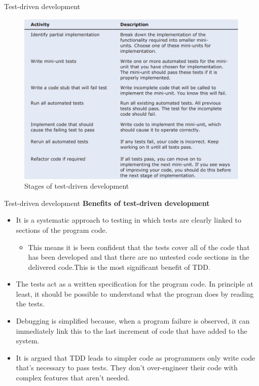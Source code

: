 \documentclass{beamer}
\begin{document}
\begin{frame}{Test-driven development}
	\begin{figure}
		\includegraphics[scale=.45]{img/m3_32}
		\caption{Stages of test-driven development}
	\end{figure}
\end{frame}
\begin{frame}{Test-driven development}
	\textbf{Benefits of test-driven development}
	\begin{itemize}
		\item It is a systematic approach to testing in which tests are clearly linked to sections of the program code. 
		\begin{itemize}
			\item This means it is been confident that the tests cover all of the code that has been developed and that there are no untested code sections in the delivered code.This is the most significant benefit of TDD. 
		\end{itemize}
	\item The tests act as a written specification for the program code. In principle at least, it should be possible to understand what the program does by reading the tests. 
	\item Debugging is simplified because, when a program failure is observed, it can immediately link this to the last increment of code that have  added to the system.
	\item It is argued that TDD leads to simpler code as programmers only write code that’s necessary to pass tests. They don’t over-engineer their code with complex features that aren’t needed.
	
	\end{itemize}
\end{frame}
\end{document}
